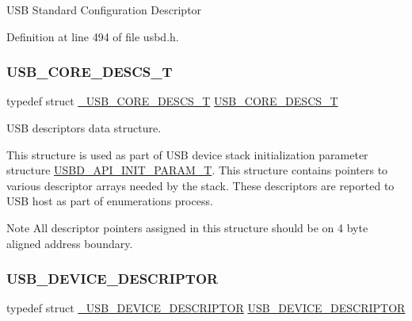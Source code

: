 U\+SB Standard Configuration Descriptor 

Definition at line 494 of file usbd.\+h.

\mbox{\label{group___u_s_b_d___core_gabdc617d119eac0555f91bea957c41ecc}} 
\subsubsection{\texorpdfstring{U\+S\+B\+\_\+\+C\+O\+R\+E\+\_\+\+D\+E\+S\+C\+S\+\_\+T}{USB\_CORE\_DESCS\_T}}
{\footnotesize\ttfamily typedef struct \hyperlink{struct___u_s_b___c_o_r_e___d_e_s_c_s___t}{\+\_\+\+U\+S\+B\+\_\+\+C\+O\+R\+E\+\_\+\+D\+E\+S\+C\+S\+\_\+T}  \hyperlink{group___u_s_b_d___core_gabdc617d119eac0555f91bea957c41ecc}{U\+S\+B\+\_\+\+C\+O\+R\+E\+\_\+\+D\+E\+S\+C\+S\+\_\+T}}



U\+SB descriptors data structure. 

This structure is used as part of U\+SB device stack initialization parameter structure \hyperlink{group___u_s_b_d___core_gaa6e8171941c1ae63afed95974e0f18e3}{U\+S\+B\+D\+\_\+\+A\+P\+I\+\_\+\+I\+N\+I\+T\+\_\+\+P\+A\+R\+A\+M\+\_\+T}. This structure contains pointers to various descriptor arrays needed by the stack. These descriptors are reported to U\+SB host as part of enumerations process.

\begin{DoxyNote}{Note}
All descriptor pointers assigned in this structure should be on 4 byte aligned address boundary. 
\end{DoxyNote}
\mbox{\label{group___u_s_b_d___core_ga7c2da119cc5c129d253d5fa766c70893}} 
\subsubsection{\texorpdfstring{U\+S\+B\+\_\+\+D\+E\+V\+I\+C\+E\+\_\+\+D\+E\+S\+C\+R\+I\+P\+T\+OR}{USB\_DEVICE\_DESCRIPTOR}}
{\footnotesize\ttfamily typedef struct \hyperlink{struct___u_s_b___d_e_v_i_c_e___d_e_s_c_r_i_p_t_o_r}{\+\_\+\+U\+S\+B\+\_\+\+D\+E\+V\+I\+C\+E\+\_\+\+D\+E\+S\+C\+R\+I\+P\+T\+OR} \hyperlink{group___u_s_b_d___core_ga7c2da119cc5c129d253d5fa766c70893}{U\+S\+B\+\_\+\+D\+E\+V\+I\+C\+E\+\_\+\+D\+E\+S\+C\+R\+I\+P\+T\+OR}}


